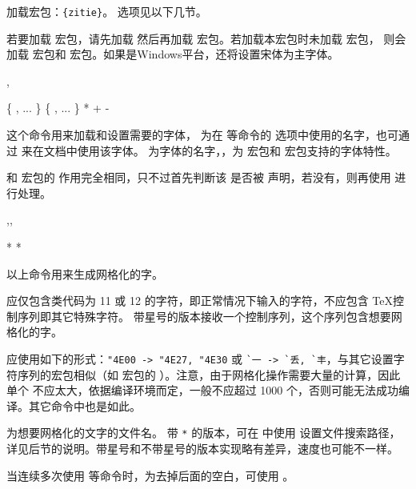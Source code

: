 \documentclass{ctxdoc}
\begin{document}
加载宏包：\verb|{zitie}|。 选项见以下几节。

若要加载  宏包，请先加载  然后再加载  宏包。若加载本宏包时未加载  宏包，
则会加载  宏包和  宏包。如果是Windows平台，还将设置宋体为主字体。

\begin{function}{\zitienewfont,\zitieCJKfamily}
  \begin{syntax}
     \{   , ... \}
     \{    , ... \}
     *   
     
    + 
    - 
  \end{syntax}
  这个命令用来加载和设置需要的字体， 为在  等命令的  选项中使用的名字，也可通过  来在文档中使用该字体。 为字体的名字，，为  宏包和  宏包支持的字体特性。

   和  宏包的  作用完全相同，只不过首先判断该  是否被  声明，若没有，则再使用  进行处理。
\end{function}

\begin{function}{\framezi,\framerange,\framezifile}
  \begin{syntax}
     *  
      
     *  
  \end{syntax}
  以上命令用来生成网格化的字。

   应仅包含类代码为 11 或 12 的字符，即正常情况下输入的字符，不应包含 \TeX 控制序列即其它特殊字符。 带星号的版本接收一个控制序列，这个序列包含想要网格化的字。

   应使用如下的形式：\verb|"4E00 -> "4E27, "4E30| 或 \verb|`一 -> `丢, `丰|，与其它设置字符序列的宏包相似（如  宏包的 ）。注意，由于网格化操作需要大量的计算，因此单个  不应太大，依据编译环境而定，一般不应超过 1000 个，否则可能无法成功编译。其它命令中也是如此。

   为想要网格化的文字的文件名。 带 \verb|*| 的版本，可在  中使用  设置文件搜索路径，详见后节的说明。带星号和不带星号的版本实现略有差异，速度也可能不一样。

  当连续多次使用  等命令时，为去掉后面的空白，可使用 \opt{\%}。
\end{function}
\end{document}
